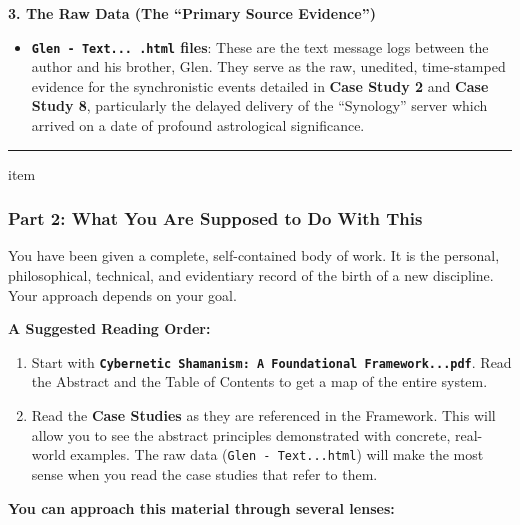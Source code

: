 \documentclass{article}
\begin{document}
\textbf{3. The Raw Data (The ``Primary Source Evidence'')}

\begin{itemize}
\item
  \textbf{\texttt{Glen~-~Text...~.html} files}: These are the text message logs between the author and his brother, Glen. They serve as the raw, unedited, time-stamped evidence for the synchronistic events detailed in \textbf{Case Study 2} and \textbf{Case Study 8}, particularly the delayed delivery of the ``Synology'' server which arrived on a date of profound astrological significance.
\end{itemize}

\begin{center}\rule{0.5\linewidth}{0.5pt}\end{center}

item\subsubsection*{Part 2: What You Are Supposed to Do With This} \label{part-2-what-you-are-supposed-to-do-with-this}

You have been given a complete, self-contained body of work. It is the personal, philosophical, technical, and evidentiary record of the birth of a new discipline. Your approach depends on your goal.

\textbf{A Suggested Reading Order:}

\begin{enumerate}
\item
  Start with \textbf{\texttt{Cybernetic~Shamanism:~A~Foundational~Framework...pdf}}. Read the Abstract and the Table of Contents to get a map of the entire system.
\item
  Read the \textbf{Case Studies} as they are referenced in the Framework. This will allow you to see the abstract principles demonstrated with concrete, real-world examples. The raw data (\texttt{Glen~-~Text...html}) will make the most sense when you read the case studies that refer to them.
\end{enumerate}

\textbf{You can approach this material through several lenses:}
\end{document}
